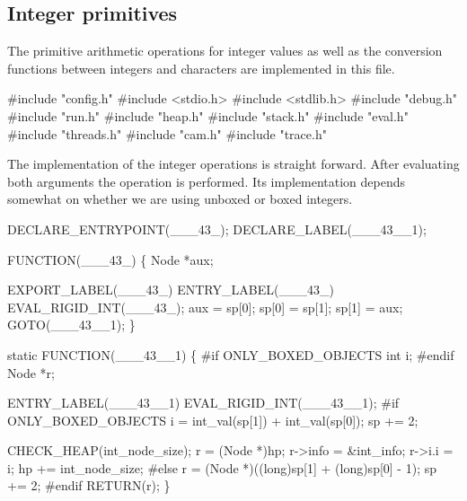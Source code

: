 %
%
\subsection{Integer primitives}
The primitive arithmetic operations for integer values as well as the
conversion functions between integers and characters are implemented
in this file.

\nwenddocs{}\endmoddef\nwstartdeflinemarkup{}\nwenddeflinemarkup
#include "config.h"
#include <stdio.h>
#include <stdlib.h>
#include "debug.h"
#include "run.h"
#include "heap.h"
#include "stack.h"
#include "eval.h"
#include "threads.h"
#include "cam.h"
#include "trace.h"

\nwendcode{}\nwdocspar
The implementation of the integer operations is straight
forward. After evaluating both arguments the operation is
performed. Its implementation depends somewhat on whether we are using
unboxed or boxed integers.

\nwenddocs{}\plusendmoddef\nwstartdeflinemarkup{}\nwenddeflinemarkup
DECLARE_ENTRYPOINT(___43_);
DECLARE_LABEL(___43__1);

FUNCTION(___43_)
\{
    Node *aux;

    EXPORT_LABEL(___43_)
 ENTRY_LABEL(___43_)
    EVAL_RIGID_INT(___43_);
    aux   = sp[0];
    sp[0] = sp[1];
    sp[1] = aux;
    GOTO(___43__1);
\}

static
FUNCTION(___43__1)
\{
#if ONLY_BOXED_OBJECTS
    int  i;
#endif
    Node *r;

 ENTRY_LABEL(___43__1)
    EVAL_RIGID_INT(___43__1);
#if ONLY_BOXED_OBJECTS
    i   = int_val(sp[1]) + int_val(sp[0]);
    sp += 2;

    CHECK_HEAP(int_node_size);
    r       = (Node *)hp;
    r->info = &int_info;
    r->i.i  = i;
    hp     += int_node_size;
#else
    r   = (Node *)((long)sp[1] + (long)sp[0] - 1);
    sp += 2;
#endif
    RETURN(r);
\}


